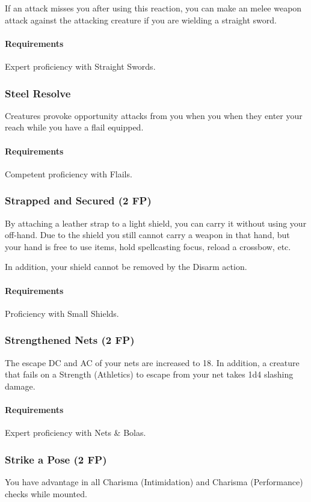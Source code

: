     If an attack misses you after using this reaction, you can make an melee weapon attack against the attacking creature if you are wielding a straight sword.
    \paragraph{Requirements} Expert proficiency with Straight Swords.
\subsubsection{Steel Resolve} \label{feat::steelresolve}
    Creatures provoke opportunity attacks from you when you when they enter your reach while you have a flail equipped.
    \paragraph{Requirements} Competent proficiency with Flails.
\subsubsection{Strapped and Secured (2 FP)} \label{feat::strappedandsecured}
    By attaching a leather strap to a light shield, you can carry it without using your off-hand.
    Due to the shield you still cannot carry a weapon in that hand, but your hand is free to use items, hold spellcasting focus, reload a crossbow, etc.

    In addition, your shield cannot be removed by the Disarm action.
    \paragraph{Requirements} Proficiency with Small Shields.
\subsubsection{Strengthened Nets (2 FP)} \label{feat::strengthenednets}
    The escape DC and AC of your nets are increased to 18.
    In addition, a creature that fails on a Strength (Athletics) to escape from your net takes 1d4 slashing damage.
    \paragraph{Requirements} Expert proficiency with Nets \& Bolas.
\subsubsection{Strike a Pose (2 FP)} \label{feat::strikeapose}
    You have advantage in all Charisma (Intimidation) and Charisma (Performance) checks while mounted.


